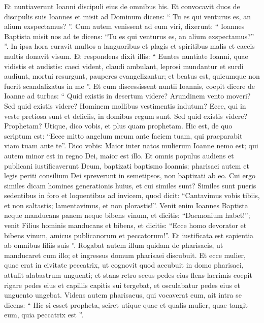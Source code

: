 \begin{biblechapter}
\begin{biblechapter}
\begin{biblechapter}
\begin{biblechapter}
\begin{biblechapter}
\begin{biblechapter}
\begin{biblechapter}
 \verse Et nuntiaverunt Ioanni discipuli eius de omnibus his. 
\verse Et convocavit duos de discipulis suis Ioannes et misit ad Dominum dicens: “ Tu es qui venturus es, an alium exspectamus? ”. 
\verse Cum autem venissent ad eum viri, dixerunt: “ Ioannes Baptista misit nos ad te dicens: “Tu es qui venturus es, an alium exspectamus?” ”. 
\verse In ipsa hora curavit multos a languoribus et plagis et spiritibus malis et caecis multis donavit visum. 
\verse Et respondens dixit illis: “ Euntes nuntiate Ioanni, quae vidistis et audistis: caeci vident, claudi ambulant, leprosi mundantur et surdi audiunt, mortui resurgunt, pauperes evangelizantur; 
\verse et beatus est, quicumque non fuerit scandalizatus in me ”.
 \verse Et cum discessissent nuntii Ioannis, coepit dicere de Ioanne ad turbas: “ Quid existis in desertum videre? Arundinem vento moveri? 
\verse Sed quid existis videre? Hominem mollibus vestimentis indutum? Ecce, qui in veste pretiosa sunt et deliciis, in domibus regum sunt. 
\verse Sed quid existis videre? Prophetam? Utique, dico vobis, et plus quam prophetam. 
\verse Hic est, de quo scriptum est:
 “Ecce mitto angelum meum ante faciem tuam,
 qui praeparabit viam tuam ante te”.
 \verse Dico vobis: Maior inter natos mulierum Ioanne nemo est; qui autem minor est in regno Dei, maior est illo. 
\verse Et omnis populus audiens et publicani iustificaverunt Deum, baptizati baptismo Ioannis; 
\verse pharisaei autem et legis periti consilium Dei spreverunt in semetipsos, non baptizati ab eo.
 \verse Cui ergo similes dicam homines generationis huius, et cui similes sunt? 
 \verse Similes sunt pueris sedentibus in foro et loquentibus ad invicem, quod dicit:
 “Cantavimus vobis tibiis, et non saltastis;
 lamentavimus, et non plorastis!”.
 \verse Venit enim Ioannes Baptista neque manducans panem neque bibens vinum, et dicitis: “Daemonium habet!”; 
\verse venit Filius hominis manducans et bibens, et dicitis: “Ecce homo devorator et bibens vinum, amicus publicanorum et peccatorum!”. 
\verse Et iustificata est sapientia ab omnibus filiis suis ”.
 \verse Rogabat autem illum quidam de pharisaeis, ut manducaret cum illo; et ingressus domum pharisaei discubuit. 
\verse Et ecce mulier, quae erat in civitate peccatrix, ut cognovit quod accubuit in domo pharisaei, attulit alabastrum unguenti; 
\verse et stans retro secus pedes eius flens lacrimis coepit rigare pedes eius et capillis capitis sui tergebat, et osculabatur pedes eius et unguento ungebat.
 \verse Videns autem pharisaeus, qui vocaverat eum, ait intra se dicens: “ Hic si esset propheta, sciret utique quae et qualis mulier, quae tangit eum, quia peccatrix est ”. 

\end{biblechapter}
\end{biblechapter}
\end{biblechapter}
\end{biblechapter}
\end{biblechapter}
\end{biblechapter}
\end{biblechapter}
